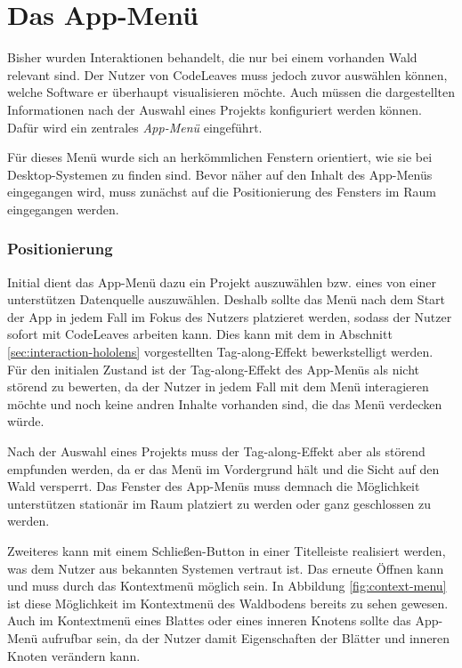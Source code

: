 \section{Das App-Menü}
\label{sec:app-menu}

Bisher wurden Interaktionen behandelt, die nur bei einem vorhanden Wald relevant sind. Der Nutzer von CodeLeaves muss jedoch zuvor auswählen können, welche Software er überhaupt visualisieren möchte. Auch müssen die dargestellten Informationen nach der Auswahl eines Projekts konfiguriert werden können. Dafür wird ein zentrales \textit{App-Menü} eingeführt.

Für dieses Menü wurde sich an herkömmlichen Fenstern orientiert, wie sie bei Desktop-Systemen zu finden sind. Bevor näher auf den Inhalt des App-Menüs eingegangen wird, muss zunächst auf die Positionierung des Fensters im Raum eingegangen werden.

\subsubsection*{Positionierung}

Initial dient das App-Menü dazu ein Projekt auszuwählen bzw. eines von einer unterstützen Datenquelle auszuwählen. Deshalb sollte das Menü nach dem Start der App in jedem Fall im Fokus des Nutzers platzieret werden, sodass der Nutzer sofort mit CodeLeaves arbeiten kann. Dies kann mit dem in Abschnitt \ref{sec:interaction-hololens} vorgestellten Tag-along-Effekt bewerkstelligt werden. Für den initialen Zustand ist der Tag-along-Effekt des App-Menüs als nicht störend zu bewerten, da der Nutzer in jedem Fall mit dem Menü interagieren möchte und noch keine andren Inhalte vorhanden sind, die das Menü verdecken würde.

Nach der Auswahl eines Projekts muss der Tag-along-Effekt aber als störend empfunden werden, da er das Menü im Vordergrund hält und die Sicht auf den Wald versperrt. Das Fenster des App-Menüs muss demnach die Möglichkeit unterstützen stationär im Raum platziert zu werden oder ganz geschlossen zu werden.

Zweiteres kann mit einem Schließen-Button in einer Titelleiste realisiert werden, was dem Nutzer aus bekannten Systemen vertraut ist. Das erneute Öffnen kann und muss durch das Kontextmenü möglich sein. In Abbildung \ref{fig:context-menu} ist diese Möglichkeit im Kontextmenü des Waldbodens bereits zu sehen gewesen. Auch im Kontextmenü eines Blattes oder eines inneren Knotens sollte das App-Menü aufrufbar sein, da der Nutzer damit Eigenschaften der Blätter und inneren Knoten verändern kann.

